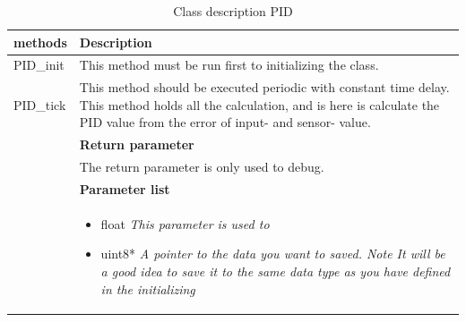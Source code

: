 \begin{table}[h!]
	\centering
	\begin{tabular}{|p{5 cm}|p{10 cm}|}
		\hline
		\textbf{methods} & \textbf{Description} \\ \hline
		
		PID\_init
		& This method must be run first to initializing the class. 
		\\ \hline
		
		PID\_tick
		& This method should be executed periodic with constant time delay. This method holds all the calculation, and is here is calculate the PID value from the error of input- and sensor- value.
		\\ & \textbf{Return parameter}
		\\ & The return parameter is only used to debug.
		\\ & \textbf{Parameter list}
		\\ & \begin{itemize}
			\item {\large float}
			\subitem \textit{This parameter is used to }
			\item {\large uint8*}
			\subitem \textit{A pointer to the data you want to saved. Note It will be a good idea to save it to the same data type as you have defined in the initializing}
		\end{itemize}
		\\ \hline

	\end{tabular}
	\caption{Class description PID}
	\label{table:Class_description_PID_RR_PSoC}
\end{table}
